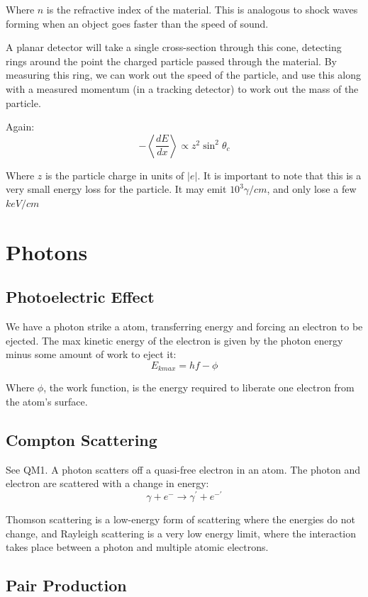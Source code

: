 Where $n$ is the refractive index of the material. This is analogous to shock waves forming when an object goes faster than the speed of sound.

A planar detector will take a single cross-section through this cone, detecting rings around the point the charged particle passed through the material. By measuring this ring, we can work out the speed of the particle, and use this along with a measured momentum (in a tracking detector) to work out the mass of the particle.

Again:
\[
    - \left< \frac{dE}{dx} \right> \propto z^2 \sin^2 \theta_c
\]

Where $z$ is the particle charge in units of $|e|$. It is important to note that this is a very small energy loss for the particle. It may emit $10^3 \gamma / \si{cm}$, and only lose a few $\si{keV} / \si{cm}$

\section{Photons}
\subsection{Photoelectric Effect}
We have a photon strike a atom, transferring energy and forcing an electron to be ejected. The max kinetic energy of the electron is given by the photon energy minus some amount of work to eject it:
\[
    E_{kmax} = hf - \phi
\]

Where $\phi$, the work function, is the energy required to liberate one electron from the atom's surface.

\subsection{Compton Scattering}
See QM1. A photon scatters off a quasi-free electron in an atom. The photon and electron are scattered with a change in energy:
\[
    \gamma + e^- \to \gamma^\prime + e^{- \prime}
\]

Thomson scattering is a low-energy form of scattering where the energies do not change, and Rayleigh scattering is a very low energy limit, where the interaction takes place between a photon and multiple atomic electrons. 

\subsection{Pair Production}



